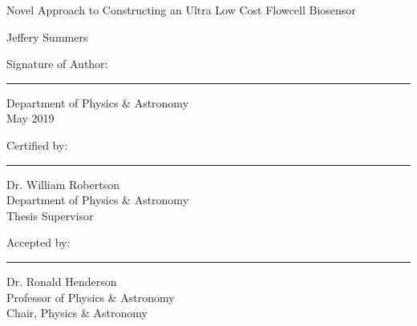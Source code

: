 \documentclass{article}%
\begin{document}
\begin{center}
{\selectfont
    Novel Approach to Constructing an Ultra Low Cost Flowcell Biosensor\\
}
\vspace{1.8cm}

{\selectfont
Jeffery Summers
}
\vspace{8cm}
\end{center}
\begin{flushleft}
    {\selectfont
    Signature of Author:\\
    }
\end{flushleft}
\vspace{0cm}
\hrule
\begin{flushright}
    {\small\selectfont
    Department of Physics \& Astronomy\\
    May 2019\\
    }
\end{flushright}
\vspace{1.5cm}
\begin{flushleft}
    {\selectfont
    Certified by:\\
    }
\end{flushleft}
\vspace{0cm}
\hrule
\begin{flushright}
    {\small\selectfont
    Dr. William Robertson\\
    Department of Physics \& Astronomy\\
    Thesis Supervisor\\
    }
\end{flushright}
\vspace{1.5cm}
\begin{flushleft}
    {\selectfont
    Accepted by:\\
    }
\end{flushleft}
\vspace{0cm}
\hrule
\begin{flushright}
    {\small\selectfont
    Dr. Ronald Henderson\\
    Professor of Physics \& Astronomy\\
    Chair, Physics \& Astronomy\\
    }
\end{flushright}
\vspace{1.5cm}
\end{document}
